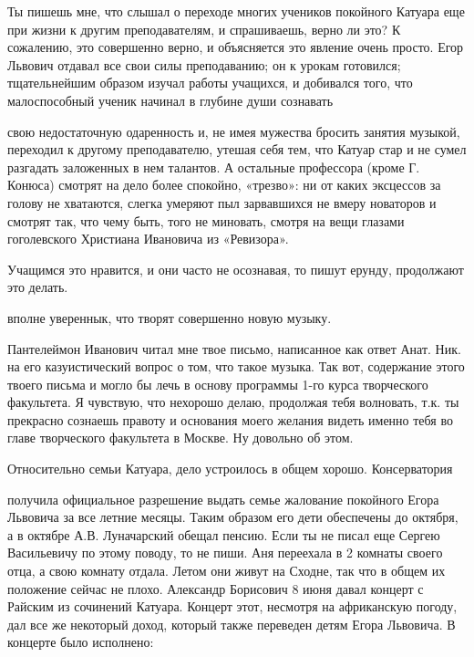 Ты пишешь мне, что слышал о переходе многих учеников покойного Катуара еще при
жизни к другим преподавателям, и спрашиваешь, верно ли это? К сожалению, это
совершенно верно, и объясняется это явление очень просто. Егор Львович отдавал
все свои силы преподаванию; он к урокам готовился; тщательнейшим образом изучал
работы учащихся, и добивался того, что малоспособный ученик начинал в глубине
души сознавать


\noindent
свою недостаточную одаренность и, не имея мужества бросить занятия музыкой,
переходил к другому преподавателю, утешая себя тем, что Катуар стар и не сумел
разгадать заложенных в нем талантов. А остальные профессора (кроме Г. Конюса)
смотрят на дело более спокойно, «трезво»: ни от каких эксцессов за голову не
хватаются, слегка умеряют пыл зарвавшихся не вмеру новаторов и смотрят так, что
чему быть, того не миновать, смотря на вещи глазами гоголевского Христиана
Ивановича из «Ревизора».

Учащимся это нравится, и они часто не осознавая, то пишут ерунду, продолжают
это делать.


\noindent
вполне увереннык, что творят совершенно новую музыку.

Пантелеймон Иванович читал мне твое письмо, написанное как ответ Анат. Ник. на
его казуистический вопрос о том, что такое музыка. Так вот, содержание этого
твоего письма и могло бы лечь в основу программы 1-го курса творческого
факультета. Я чувствую, что нехорошо делаю, продолжая тебя волновать, т.к. ты
прекрасно сознаешь правоту и основания моего желания видеть именно тебя во
главе творческого факультета в Москве.
Ну довольно об этом.

Относительно семьи Катуара, дело устроилось в общем хорошо. Консерватория


\noindent
получила официальное разрешение выдать семье жалование покойного Егора Львовича
за все летние месяцы. Таким образом его дети обеспечены до октября, а в октябре
А.В. Луначарский обещал пенсию. Если ты не писал еще Сергею Васильевичу по
этому поводу, то не пиши. Аня переехала в 2 комнаты своего отца, а свою комнату
отдала. Летом они живут на Сходне, так что в общем их положение сейчас не
плохо. Александр Борисович 8 июня давал концерт с Райским из сочинений Катуара.
Концерт этот, несмотря на африканскую погоду, дал все же некоторый доход,
который также переведен детям Егора Львовича. В концерте было исполнено:

